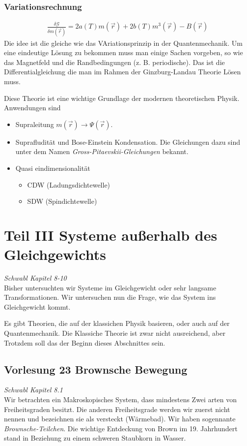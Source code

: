 \begin{description}
\subsubsection*{Variationsrechnung}
%
\begin{align*}
  \frac{\delta \mathcal{G}}{\delta m(\vec{r})} = 2 a(T) m(\vec{r}) +
  2 b(T) m^3(\vec{r}) - B(\vec{r})
\end{align*}
%
Die idee ist die gleiche wie das VAriationsprinzip in der Quantenmechanik.
Um eine eindeutige Lösung zu bekommen muss man einige Sachen vorgeben, so wie
das Magnetfeld und die Randbedingungen (z. B. periodische). Das ist die Differentialgleichung
die man im Rahmen der Ginzburg-Landau Theorie Lösen muss.


Diese Theorie ist eine wichtige Grundlage der modernen theoretischen Physik.
Anwendungen sind
\begin{itemize}
  \item Supraleitung $m(\vec{r}) \to \Psi(\vec{r})$.
  \item Suprafludität und Bose-Einstein Kondensation. Die Gleichungen dazu
    sind unter dem Namen \emph{Gross-Pitaevskii-Gleichungen} bekannt.
  \item Quasi eindimensionalität
    \begin{itemize}
      \item CDW (Ladungsdichtewelle)
      \item SDW (Spindichtewelle)
    \end{itemize}
\end{itemize}
\section*{Teil III Systeme außerhalb des Gleichgewichts}
\emph{Schwabl Kapitel 8-10} \\
Bisher untersuchten wir Systeme im Gleichgewicht oder sehr langsame Transformationen.
Wir untersuchen nun die Frage, wie das System ins Gleichgewicht kommt.

Es gibt Theorien, die auf der klassichen Physik basieren, oder auch auf der Quantenmechanik.
Die Klassiche Theorie ist zwar nicht ausreichend, aber Trotzdem soll das der Beginn
dieses Abschnittes sein.

\subsection*{Vorlesung 23 Brownsche Bewegung}
\emph{Schwabl Kapitel 8.1} \\
Wir betrachten ein Makroskopisches System, dass mindestens Zwei arten von
Freiheitsgraden besitzt. Die anderen Freiheitsgrade werden wir zuerst nicht
nennen und bezeichnen sie als versteckt (Wärmebad). Wir haben sogennante \emph{Brownsche-Teilchen}.
Die wichtige Entdeckung von Brown im 19. Jahrhundert stand in Beziehung
zu einem schweren Staubkorn in Wasser.


\end{description}

